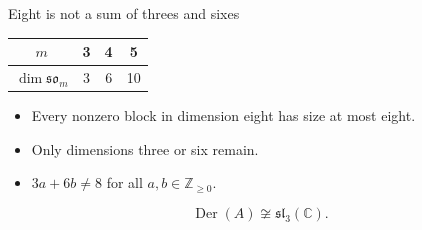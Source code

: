 \documentclass{beamer}
\begin{document}
\begin{frame}{Eight is not a sum of threes and sixes}
\begin{center}\begin{tabular}{c|ccc}$m$&3&4&5\\\hline$\dim\mathfrak{so}_m$&3&6&10\end{tabular}\end{center}\begin{itemize}\item Every nonzero block in dimension eight has size at most eight.\item Only dimensions three or six remain.\item $3a+6b\ne8$ for all $a,b\in\mathbb Z_{\ge0}$.\end{itemize}\[\operatorname{Der}(A)\not\cong\mathfrak{sl}_3(\mathbb C).\]
\end{frame}
\end{document}
